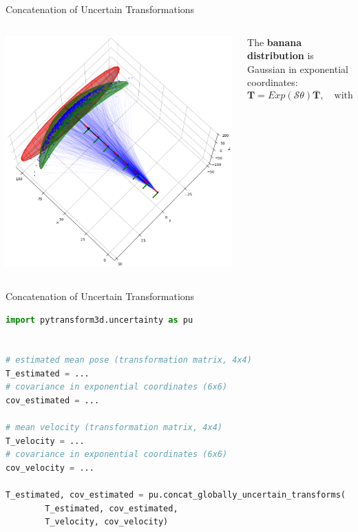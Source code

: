 \documentclass[14pt,aspectratio=169]{beamer}
\begin{document}
\begin{frame}[fragile]{Concatenation of Uncertain Transformations}
\begin{columns}
\begin{column}{0.3\textwidth}
\includegraphics[width=\textwidth]{images/state_estimation_4}
\end{column}
\begin{column}{0.65\textwidth}
The \textbf{banana distribution} is Gaussian in exponential coordinates:
\[
\boldsymbol{T} = Exp(\mathcal{S}\theta) \overline{\boldsymbol{T}},\quad \textrm{with} \quad \mathcal{S}\theta \sim \mathcal{N}\left(\boldsymbol{0}, \boldsymbol{\Sigma}_{6 \times 6}\right)
\]
\parencite{Long2012,Barfoot2014}
\end{column}
\end{columns}
\end{frame}

\begin{frame}[fragile]{Concatenation of Uncertain Transformations}
\begin{lstlisting}[language=Python]
import pytransform3d.uncertainty as pu


# estimated mean pose (transformation matrix, 4x4)
T_estimated = ...
# covariance in exponential coordinates (6x6)
cov_estimated = ...

# mean velocity (transformation matrix, 4x4)
T_velocity = ...
# covariance in exponential coordinates (6x6)
cov_velocity = ...

T_estimated, cov_estimated = pu.concat_globally_uncertain_transforms(
        T_estimated, cov_estimated,
        T_velocity, cov_velocity)
\end{lstlisting}
\end{frame}
\end{document}
